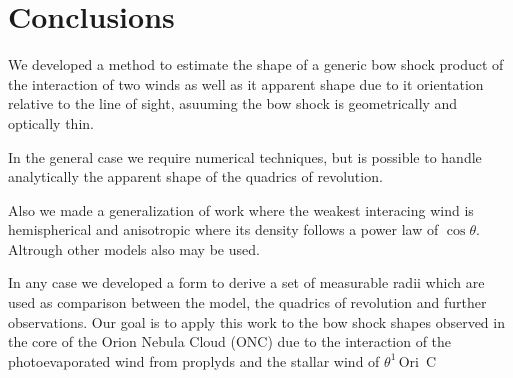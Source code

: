 \section{Conclusions}
\label{sec:conc}

\newcommand\thC{\(\theta^1\)\,Ori~C}

We developed a method to estimate the shape of a generic bow shock product of the
interaction of two winds as well as it apparent shape due to it orientation relative to the line of sight, asuuming
the bow shock is geometrically and optically thin.

In the general case we require numerical techniques, but is possible to handle analytically the apparent shape of
the quadrics of revolution. 

Also we made a generalization of \CRW{} work where the weakest interacing wind is hemispherical and anisotropic where its
density follows a power law of $\cos\theta$. Altrough other models also may be used.

In any case we developed a form to derive a set of measurable radii which are used as comparison between the \CRW{} model, the quadrics
of revolution and further observations. Our goal is to apply this work to the bow shock shapes observed in the core of the Orion Nebula Cloud
(ONC) due to the interaction of the photoevaporated wind from proplyds and the stallar wind of \thC{}



